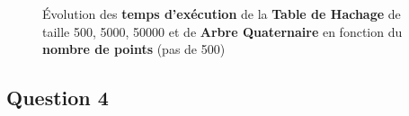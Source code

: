 \documentclass[12pt]{extarticle}
\begin{document}
\begin{center}
\begin{figure} %
  \centering %
  \captionsetup{justification=centering} %
  \caption{Évolution des \textbf{temps d'exécution} de la \textbf{Table de Hachage} de taille 500, 5000, 50000 et de \textbf{Arbre Quaternaire} en fonction du \textbf{nombre de points} (pas de 500)} %
  \label{fig:exemple} %
\end{figure}
\end{center} 



\subsection*{Question 4}
\end{document}
